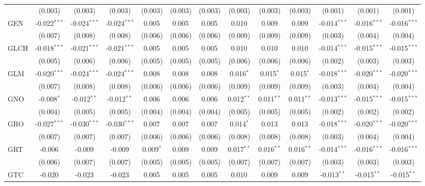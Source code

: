 \begin{table}[!htbp]
\begin{tabular}{@{\extracolsep{5pt}}lcccccccccccc}
  & (0.003) & (0.003) & (0.003) & (0.003) & (0.003) & (0.003) & (0.003) & (0.003) & (0.003) & (0.001) & (0.001) & (0.001) \\
 GEN & -0.022$^{***}$ & -0.024$^{***}$ & -0.024$^{***}$ & 0.005$^{}$ & 0.005$^{}$ & 0.005$^{}$ & 0.010$^{}$ & 0.009$^{}$ & 0.009$^{}$ & -0.014$^{***}$ & -0.016$^{***}$ & -0.016$^{***}$ \\
  & (0.007) & (0.008) & (0.008) & (0.006) & (0.006) & (0.006) & (0.009) & (0.009) & (0.009) & (0.003) & (0.004) & (0.004) \\
 GLCH & -0.018$^{***}$ & -0.021$^{***}$ & -0.021$^{***}$ & 0.005$^{}$ & 0.005$^{}$ & 0.005$^{}$ & 0.010$^{}$ & 0.010$^{}$ & 0.010$^{}$ & -0.014$^{***}$ & -0.015$^{***}$ & -0.015$^{***}$ \\
  & (0.005) & (0.006) & (0.006) & (0.005) & (0.005) & (0.005) & (0.006) & (0.006) & (0.006) & (0.002) & (0.003) & (0.003) \\
 GLM & -0.020$^{***}$ & -0.024$^{***}$ & -0.024$^{***}$ & 0.008$^{}$ & 0.008$^{}$ & 0.008$^{}$ & 0.016$^{*}$ & 0.015$^{*}$ & 0.015$^{*}$ & -0.018$^{***}$ & -0.020$^{***}$ & -0.020$^{***}$ \\
  & (0.007) & (0.008) & (0.008) & (0.006) & (0.006) & (0.006) & (0.009) & (0.009) & (0.009) & (0.003) & (0.004) & (0.004) \\
 GNO & -0.008$^{*}$ & -0.012$^{**}$ & -0.012$^{**}$ & 0.006$^{}$ & 0.006$^{}$ & 0.006$^{}$ & 0.012$^{**}$ & 0.011$^{**}$ & 0.011$^{**}$ & -0.013$^{***}$ & -0.015$^{***}$ & -0.015$^{***}$ \\
  & (0.004) & (0.005) & (0.005) & (0.004) & (0.004) & (0.004) & (0.005) & (0.005) & (0.005) & (0.002) & (0.002) & (0.002) \\
 GRO & -0.027$^{***}$ & -0.030$^{***}$ & -0.030$^{***}$ & 0.007$^{}$ & 0.007$^{}$ & 0.007$^{}$ & 0.014$^{*}$ & 0.013$^{}$ & 0.013$^{}$ & -0.018$^{***}$ & -0.020$^{***}$ & -0.020$^{***}$ \\
  & (0.007) & (0.007) & (0.007) & (0.006) & (0.006) & (0.006) & (0.008) & (0.008) & (0.008) & (0.003) & (0.004) & (0.004) \\
 GRT & -0.006$^{}$ & -0.009$^{}$ & -0.009$^{}$ & 0.009$^{*}$ & 0.009$^{}$ & 0.009$^{}$ & 0.017$^{**}$ & 0.016$^{**}$ & 0.016$^{**}$ & -0.014$^{***}$ & -0.016$^{***}$ & -0.016$^{***}$ \\
  & (0.006) & (0.007) & (0.007) & (0.005) & (0.005) & (0.005) & (0.007) & (0.007) & (0.007) & (0.003) & (0.003) & (0.003) \\
 GTC & -0.020$^{}$ & -0.023$^{}$ & -0.023$^{}$ & 0.005$^{}$ & 0.005$^{}$ & 0.005$^{}$ & 0.010$^{}$ & 0.009$^{}$ & 0.009$^{}$ & -0.013$^{**}$ & -0.015$^{**}$ & -0.015$^{**}$ \\

\end{tabular}
\end{table}
